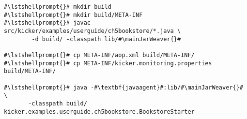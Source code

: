 \begin{lstlisting}[caption=Commands to compile and run the Bookstore under \UnixLikeSystems, label=lst:traceAnalysisCompileRunExample1]
#\lstshellprompt{}# mkdir build
#\lstshellprompt{}# mkdir build/META-INF
#\lstshellprompt{}# javac src/kicker/examples/userguide/ch5bookstore/*.java \
        -d build/ -classpath lib/#\mainJarWeaver{}#

#\lstshellprompt{}# cp META-INF/aop.xml build/META-INF/
#\lstshellprompt{}# cp META-INF/kicker.monitoring.properties build/META-INF/

#\lstshellprompt{}# java -#\textbf{javaagent}#:lib/#\mainJarWeaver{}# \
       -classpath build/ kicker.examples.userguide.ch5bookstore.BookstoreStarter
\end{lstlisting}
